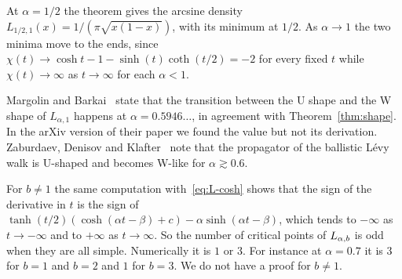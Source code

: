 At $\alpha=1/2$ the theorem gives the arcsine density
$L_{1/2,1}(x)=1/(\pi\sqrt{x(1-x)})$, with its minimum at $1/2$. As $\alpha\to1$ the two
minima move to the ends, since $\chi(t)\to\cosh t-1-\sinh(t)\coth(t/2)=-2$ for every
fixed $t$ while $\chi(t)\to\infty$ as $t\to\infty$ for each $\alpha<1$.

Margolin and Barkai~\cite[Section~III]{margolinbarkai2006} state that the transition
between the U shape and the W shape of $L_{\alpha,1}$ happens at $\alpha=0.5946\ldots$,
in agreement with Theorem~\ref{thm:shape}. In the arXiv version of their paper we found
the value but not its derivation. Zaburdaev, Denisov and Klafter~\cite[Section~II.A.3]{zdk2015}
note that the propagator of the ballistic L\'evy walk is U-shaped and becomes W-like
for $\alpha\gtrsim0.6$.

\begin{remark}\label{rem:unequal}
For $b\ne1$ the same computation with~\eqref{eq:L-cosh} shows that the sign of the
derivative in $t$ is the sign of $\tanh(t/2)(\cosh(\alpha t-\beta)+c)-\alpha\sinh(\alpha t-\beta)$,
which tends to $-\infty$ as $t\to-\infty$ and to $+\infty$ as $t\to\infty$. So the number
of critical points of $L_{\alpha,b}$ is odd when they are all simple. Numerically it is $1$ or
$3$. For instance at $\alpha=0.7$ it is $3$ for $b=1$ and $b=2$ and $1$ for $b=3$. We do
not have a proof for $b\ne1$.
\end{remark}
